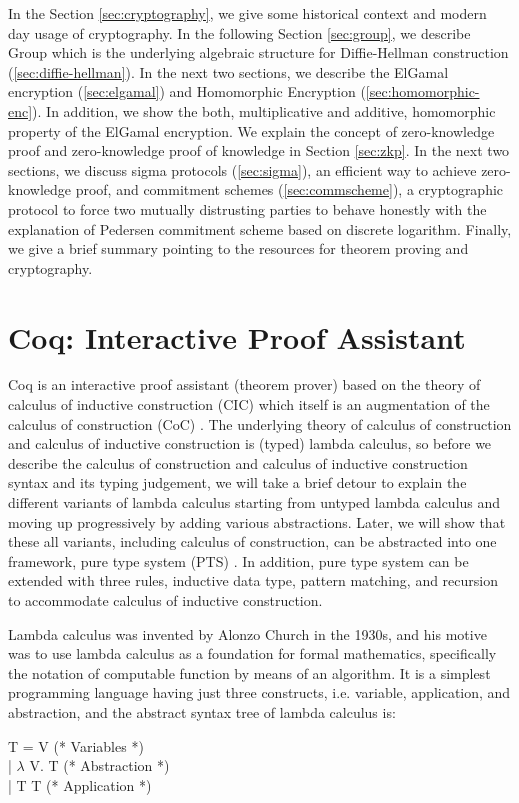 In the Section \ref{sec:cryptography}, we give some historical 
 context and modern day usage of cryptography.  In the following Section 
 \ref{sec:group}, we describe Group which is the underlying 
 algebraic structure for Diffie-Hellman construction (\ref{sec:diffie-hellman}). 
 In the next two sections, we describe the ElGamal encryption (\ref{sec:elgamal}) 
 and Homomorphic Encryption (\ref{sec:homomorphic-enc}). In addition, 
 we show the both, multiplicative and additive,  homomorphic property
 of the ElGamal encryption. We explain the concept of zero-knowledge proof 
 and zero-knowledge proof  of knowledge in Section \ref{sec:zkp}. 
 In the next two sections, we discuss sigma protocols (\ref{sec:sigma}), 
 an efficient way to achieve zero-knowledge proof, and commitment schemes
 (\ref{sec:commscheme}), a cryptographic protocol to force two mutually 
 distrusting parties to behave honestly with the explanation of Pedersen 
 commitment scheme based on discrete logarithm.  Finally, we give a 
 brief summary pointing to the resources for theorem proving and 
 cryptography. 
 


\section{Coq: Interactive Proof Assistant}
\label{sec:problemstatement}
Coq  is an interactive proof assistant (theorem prover) based on
the theory of calculus of 
inductive construction (CIC) \citep{Paulin-Mohring:1993:IDS:645891.671440} which itself is an 
augmentation of the calculus of construction (CoC) 
\citep{Coquand:1988:CC:47724.47725}.  
The underlying theory of calculus of construction and calculus of 
inductive construction is (typed) lambda calculus, so 
before we describe the calculus of construction and calculus of inductive 
construction syntax and its typing judgement, 
we will take a brief detour to explain the
different variants of lambda calculus starting from 
untyped lambda calculus and moving up progressively by 
adding various abstractions. Later, we will show that 
these all variants, including calculus of construction, can be abstracted into one 
framework,  pure type system (PTS) \citep{berardi1988towards} 
\citep{Barendregt:1993:LCT:162552.162561}.  
In addition, 
pure type system can be extended with three rules, 
inductive data type, pattern matching, and recursion 
to accommodate calculus of inductive construction.

Lambda calculus was invented by Alonzo Church in the 1930s, 
and his motive was to use lambda calculus as a foundation 
for formal mathematics, specifically the notation of 
computable function by means of an algorithm.  
It is a simplest programming language having just 
three constructs, i.e. variable, application, and abstraction, 
and the abstract syntax tree of lambda calculus is:
\begin{displayquote}

T = V (* Variables *) \\
   | $\lambda$ V. T (* Abstraction *) \\
   | T T       (* Application *)

\end{displayquote}

